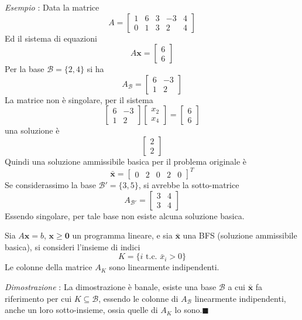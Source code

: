 \documentclass[10pt, letterpaper]{report}
\newcommand{\x}{{\mathbf{x}}}
\begin{document}
\textit{Esempio} : Data la matrice \begin{equation}
    A=\begin{bmatrix}
        1&6&3&-3&4\\ 
        0&1&3&2&4
    \end{bmatrix}
\end{equation}
Ed il sistema di equazioni 
$$ A\mathbf x = \begin{bmatrix}
    6\\6
\end{bmatrix}$$
Per la base  $\mathcal B = \{2,4\}$ si ha $$A_{\mathcal B}=\begin{bmatrix}
    6&-3\\1&2
\end{bmatrix} $$
La matrice non è singolare, per il sistema $$ \begin{bmatrix}
    6&-3\\1&2
\end{bmatrix}\begin{bmatrix}
    x_2\\x_4
\end{bmatrix}  = \begin{bmatrix}
    6\\6
\end{bmatrix}$$
una soluzione è $$ \begin{bmatrix}
    2\\2
\end{bmatrix}$$
Quindi una soluzione ammissibile basica per il problema originale è 
$$ \bar{\mathbf x}=\begin{bmatrix}
    0&2&0&2&0
\end{bmatrix}^T$$
Se considerassimo la base $\mathcal B' = \{3,5\}$, si avrebbe la sotto-matrice 
$$A_{\mathcal B'}= \begin{bmatrix}
    3&4\\3&4
\end{bmatrix}$$
Essendo singolare, per tale base non esiste alcuna soluzione basica.
\begin{proposizione}\label{insiemeK}
    Sia $A\mathbf x=b$, $\mathbf x \ge  \mathbf 0$ un programma lineare, e sia $\mathbf{\bar x}$ una BFS (soluzione ammissibile basica), si consideri l'insieme di indici 
    $$ K=\{i \text{ t.c. }\bar x_i>0\}$$
    Le colonne della matrice $A_K$ sono linearmente indipendenti. 
\end{proposizione}
\textit{Dimostrazione} : La dimostrazione è banale, esiste una base $\mathcal B$ a cui $\mathbf{\bar x}$ fa riferimento per cui $K\subseteq \mathcal B$, essendo le colonne di $A_{\mathcal B}$ linearmente indipendenti, anche un loro sotto-insieme, ossia quelle di $A_K$ lo sono.\hfill$\blacksquare$
\end{document}
